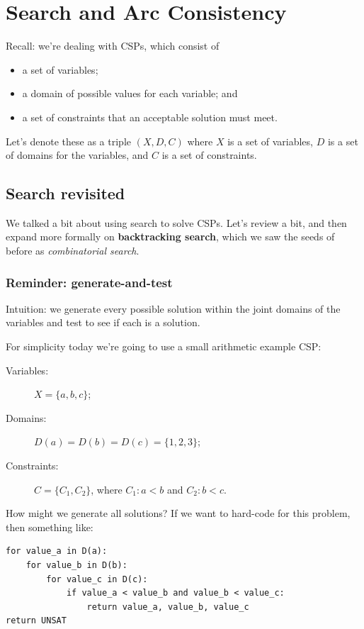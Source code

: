 \documentclass[11pt]{article}
\begin{document}
\section{Search and Arc Consistency}

Recall: we're dealing with CSPs, which consist of
\begin{itemize}
    \item a set of variables;
    \item a domain of possible values for each variable; and
    \item a set of constraints that an acceptable solution must meet.
\end{itemize}

Let's denote these as a triple $(X, D, C)$ where $X$ is a set of variables, $D$ is a set of domains for the variables, and $C$ is a set of constraints.

\subsection{Search revisited}

We talked a bit about using search to solve CSPs. Let's review a bit, and then expand more formally on \textbf{backtracking search}, which we saw the seeds of before as \emph{combinatorial search}.

\subsubsection{Reminder: generate-and-test}

Intuition: we generate every possible solution within the joint domains of the variables and test to see if each is a solution.

For simplicity today we're going to use a small arithmetic example CSP:
\begin{description}
    \item[Variables:] $X = \{a, b, c\}$;
    \item[Domains:] $D(a) = D(b) = D(c) = \{1, 2, 3\}$;
    \item[Constraints:] $C = \{C_1, C_2\}$, where $C_1: a < b$ and $C_2: b < c$.
\end{description}

How might we generate all solutions? If we want to hard-code for this problem, then something like:

\begin{verbatim}
for value_a in D(a):
    for value_b in D(b):
        for value_c in D(c):
            if value_a < value_b and value_b < value_c:
                return value_a, value_b, value_c
return UNSAT
\end{verbatim}
\end{document}
